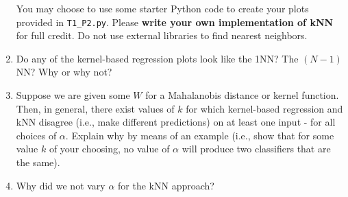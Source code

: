 \documentclass[submit]{harvardml}
\begin{document}
\begin{problem}
\begin{enumerate}
  You may choose to use some starter Python code to create your plots
  provided in \verb|T1_P2.py|.  Please \textbf{write your own
    implementation of kNN} for full credit.  Do not use external
  libraries to find nearest neighbors.
  
\item Do any of the kernel-based regression plots look like the 1NN?
  The $(N-1)$NN?  Why or why not?

\item Suppose we are given some $W$ for a Mahalanobis distance or
  kernel function.  Then, in general, there exist values of $k$ for which
  kernel-based regression and kNN disagree (i.e., make different predictions)
  on at least one input - for all choices of $\alpha$. Explain why by means of
  an example (i.e., show that for some value $k$ of your choosing,
  no value of $\alpha$ will produce two classifiers that are the same).
    
\item Why did we not vary $\alpha$ for the kNN approach?    

\end{enumerate}

\end{problem}
\end{document}
